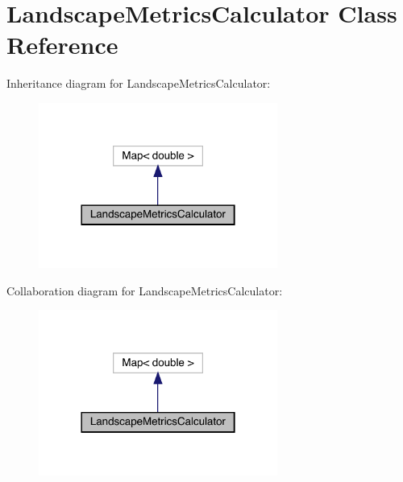 \hypertarget{class_landscape_metrics_calculator}{}\section{Landscape\+Metrics\+Calculator Class Reference}
\label{class_landscape_metrics_calculator}


Inheritance diagram for Landscape\+Metrics\+Calculator\+:
\nopagebreak
\begin{figure}[H]
\begin{center}
\leavevmode
\includegraphics[width=222pt]{class_landscape_metrics_calculator__inherit__graph}
\end{center}
\end{figure}


Collaboration diagram for Landscape\+Metrics\+Calculator\+:
\nopagebreak
\begin{figure}[H]
\begin{center}
\leavevmode
\includegraphics[width=222pt]{class_landscape_metrics_calculator__coll__graph}
\end{center}
\end{figure}
